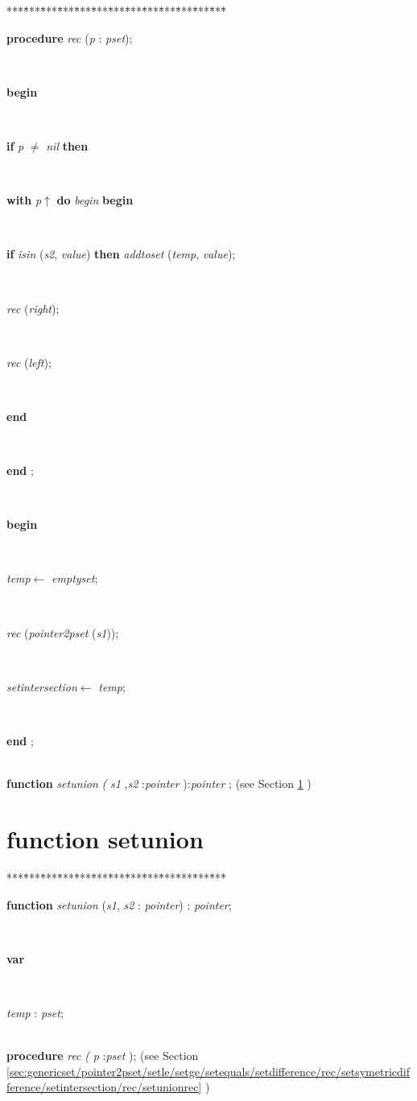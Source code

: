 \documentclass[10pt, a4paper]{article}
\begin{document}
\begin{tabbing}
***\=***\=***\=***\=***\=***\=***\=***\=***\=***\=***\=***\=***\=\kill
\parbox{14cm}{\textsf {\textbf {procedure } \textsf{\textit{rec} (\textit{p} : \textit{pset})}; }}\\
\+\parbox{14cm}{\textsf{\textbf{begin} }}\\
\+\parbox{14cm}{\textsf {\textbf {if } \textsf{\textit{p} $\neq$ \textit{nil}} \textbf{ then } }}\\
\+\<\parbox{14cm}{\textsf {\textbf {with } \textsf{\textit{p}$\uparrow$\textit{}} \textbf{ do } \textsf{\textit{begin}} \textbf{ begin } }}\\
\parbox{14cm}{\textsf {\textbf {if } \textsf{\textit{isin} (\textit{s2}, \textit{value})} \textbf{ then } \textsf{\textit{addtoset} (\textit{temp}, \textit{value})}; }}\\
\parbox{14cm}{\textsf{\textit{rec} (\textit{right})}; }\\
\parbox{14cm}{\textsf{\textit{rec} (\textit{left})}; }\\
\<\-\parbox{14cm}{\textsf{\textbf{end} }}\\
\<\-\<\-\parbox{14cm}{\textsf{\textbf{end} ;}}\\
\+\parbox{14cm}{\textsf{\textbf{begin} }}\\
\parbox{14cm}{\textsf{\textit{temp}$\leftarrow$ \textit{emptyset}}; }\\
\parbox{14cm}{\textsf{\textit{rec} (\textit{pointer2pset} (\textit{s1}))}; }\\
\parbox{14cm}{\textsf{\textit{setintersection}$\leftarrow$ \textit{temp}}; }\\
\<\-\parbox{14cm}{\textsf{\textbf{end} ;}}\\
\+\textsf{\textbf{function}  \textit{setunion} \textit{(} \textit{s1} ,\textit{s2} :\textit{pointer} ):\textit{pointer} ;} (see Section \ref{sec:genericset/pointer2pset/setle/setge/setequals/setdifference/rec/setsymetricdifference/setintersection/recsetunion} )\\
\end{tabbing}
\section{function setunion}\label{sec:genericset/pointer2pset/setle/setge/setequals/setdifference/rec/setsymetricdifference/setintersection/recsetunion}

\begin{tabbing}
***\=***\=***\=***\=***\=***\=***\=***\=***\=***\=***\=***\=***\=\kill
\parbox{14cm}{\textsf {\textbf {function } \textsf{\textit{setunion} (\textit{s1}, \textit{s2} : \textit{pointer}) : \textit{pointer}}; }}\\
\+\parbox{14cm}{\textsf{\textbf{var} }}\\
\parbox{14cm}{\textsf{\textit{temp} : \textit{pset}}; }\\
\<\textsf{\textbf{procedure}  \textit{rec} \textit{(} \textit{p} :\textit{pset} );} (see Section \ref{sec:genericset/pointer2pset/setle/setge/setequals/setdifference/rec/setsymetricdifference/setintersection/rec/setunionrec} )\\
\end{tabbing}
\end{document}
